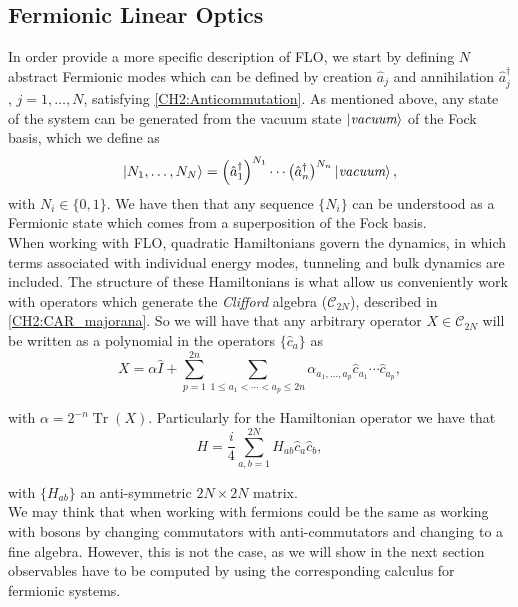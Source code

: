 \subsection{Fermionic Linear Optics}
In order provide a more specific description of FLO, we start by defining $N$ abstract Fermionic modes which can be defined by creation $\hat{a}_j$ and annihilation $\hat{a}_j^{\dagger}$, $j=1,\ldots,N$, satisfying \eqref{CH2:Anticommutation}. As mentioned above, any state of the system can be generated from the vacuum state $\mathinner{|{\textit{vacuum}}\rangle}$ of the Fock basis, which we define as
\begin{equation}
\mathinner{|{N_1,\ldots,N_{N}}\rangle} = \left(\hat{a}_{1}^{\dagger}\right)^{N_{1}} \cdots\left(\hat{a}_{n}^{\dagger}\right)^{N_{n}}\left|\textit{vacuum}\right\rangle,
\label{CH2:Fock_Space}
\end{equation}
with $N_i\in \{0,1\}$. We have then that any sequence $\{N_i\}$ can be understood as a Fermionic state which comes from a superposition of the Fock basis.\\
\indent When working with FLO, quadratic Hamiltonians govern the dynamics, in which terms associated with individual energy modes, tunneling and bulk dynamics are included. The structure of these Hamiltonians is what allow us conveniently work with operators which generate the \textit{Clifford} algebra ($\mathcal{C}_{2N}$), described in \eqref{CH2:CAR_majorana}. So we will have that any arbitrary operator $X\in \mathcal{C}_{2N}$ will be written as a polynomial in the operators $\{\hat{c}_a\}$ as
\begin{equation}
X=\alpha \hat{I}+\sum_{p=1}^{2 n} \sum_{1 \leq a_{1}<\cdots<a_{p} \leq 2 n} \alpha_{a_{1}, \ldots, a_{p}} \hat{c}_{a_{1}} \cdots \hat{c}_{a_{p}},
\label{CH2:operators_in_clifford}
\end{equation}

with $\alpha=2^{-n} \operatorname{Tr}(X)$. Particularly for the Hamiltonian operator we have that
\begin{equation}
H=\frac{i}{4} \sum_{a, b=1}^{2 N} H_{a b} \hat{c}_{a} \hat{c}_{b},
\label{CH2:Hamiltonian_in_CLifford}
\end{equation}

with $\{H_{a b}\}$ an anti-symmetric $2N\times 2N$ matrix.\\
We may think that when working with fermions could be the same as working with bosons by changing commutators with anti-commutators and changing to a fine algebra. However, this is not the case, as we will show in the next section observables have to be computed by using the corresponding calculus for fermionic systems.

